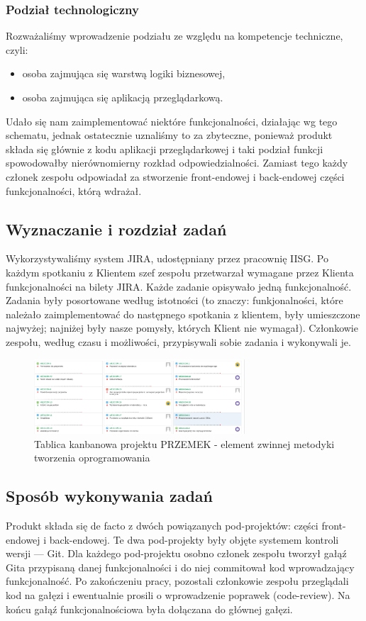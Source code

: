 \documentclass[polish,12pt]{aghthesis}
\begin{document}
\subsubsection{Podział technologiczny}
Rozważaliśmy wprowadzenie podziału ze względu na kompetencje techniczne, czyli:
\begin{itemize}
    \item osoba zajmująca się warstwą logiki biznesowej,
    \item osoba zajmująca się aplikacją przeglądarkową.
\end{itemize}
Udało się nam zaimplementować niektóre funkcjonalności, działając wg tego schematu, jednak ostatecznie uznaliśmy to za zbyteczne, ponieważ produkt składa się głównie z kodu aplikacji przeglądarkowej i taki podział funkcji spowodowałby nierównomierny rozkład odpowiedzialności. Zamiast tego każdy członek zespołu odpowiadał za stworzenie front-endowej i back-endowej części funkcjonalności, którą wdrażał.

\subsection{Wyznaczanie i rozdział zadań}
Wykorzystywaliśmy system JIRA, udostępniany przez pracownię IISG. Po każdym spotkaniu z Klientem szef zespołu przetwarzał wymagane przez Klienta funkcjonalności na bilety JIRA. Każde zadanie opisywało jedną funkcjonalność. Zadania były posortowane według istotności (to znaczy: funkjonalności, które należało zaimplementować do następnego spotkania z klientem, były umieszczone najwyżej; najniżej były nasze pomysły, których Klient nie wymagał). Członkowie zespołu, według czasu i możliwości, przypisywali sobie zadania i wykonywali je.
 \begin{figure}[H]
    \includegraphics[width=0.7\textwidth]{jira-kanban}
    \caption{Tablica kanbanowa projektu PRZEMEK - element zwinnej metodyki tworzenia oprogramowania}
    \end{figure}

\subsection{Sposób wykonywania zadań}
Produkt składa się de facto z dwóch powiązanych pod-projektów: części front-endowej i back-endowej. Te dwa pod-projekty były objęte systemem kontroli wersji --- Git. Dla każdego pod-projektu osobno członek zespołu tworzył gałąź Gita przypisaną danej funkcjonalności i do niej commitował kod wprowadzający funkcjonalność. Po zakończeniu pracy, pozostali członkowie zespołu przeglądali kod na gałęzi i ewentualnie prosili o wprowadzenie poprawek (code-review). Na końcu gałąź funkcjonalnościowa była dołączana do głównej gałęzi.
\end{document}
